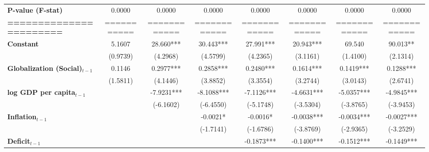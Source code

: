\begin{center}
\begin{tabular}{lccccccc}
\textbf{P-value (F-stat)}          &       0.0000      &        0.0000        &           0.0000          &       0.0000       &      0.0000     &           0.0000          &            0.0000             \\
\textbf{=======================}   &    ===========    &     ============     &        ============       &    ============    &   ============  &        ============       &         ============          \\
\textbf{Constant}                     &       5.1607      &      28.660***       &         30.443***         &     27.991***      &    20.943***    &           69.540          &           90.013**            \\
\textbf{ }                         &      (0.9739)     &       (4.2968)       &          (4.5799)         &      (4.2365)      &     (3.1161)    &          (1.4100)         &           (2.1314)            \\
\textbf{Globalization (Social)$_{t-1}$}             &       0.1146      &      0.2977***       &         0.2858***         &     0.2480***      &    0.1614***    &         0.1419***         &          0.1288***            \\
\textbf{ }                         &      (1.5811)     &       (4.1446)       &          (3.8852)         &      (3.3554)      &     (3.2744)    &          (3.0143)         &           (2.6741)            \\
\textbf{log GDP per capita$_{t-1}$}           &                   &      -7.9231***      &         -8.1088***        &     -7.1126***     &    -4.6631***   &         -5.0357***        &          -4.9845***           \\
\textbf{ }                         &                   &      (-6.1602)       &         (-6.4550)         &     (-5.1748)      &    (-3.5304)    &         (-3.8765)         &          (-3.9453)            \\
\textbf{Inflation$_{t-1}$}      &                   &                      &          -0.0021*         &      -0.0016*      &    -0.0038***   &         -0.0034***        &          -0.0027***           \\
\textbf{ }                         &                   &                      &         (-1.7141)         &     (-1.6786)      &    (-3.8769)    &         (-2.9365)         &          (-3.2529)            \\
\textbf{Deficit$_{t-1}$}             &                   &                      &                           &     -0.1873***     &    -0.1400***   &         -0.1512***        &          -0.1449***           \\

\end{tabular}
\end{center}
